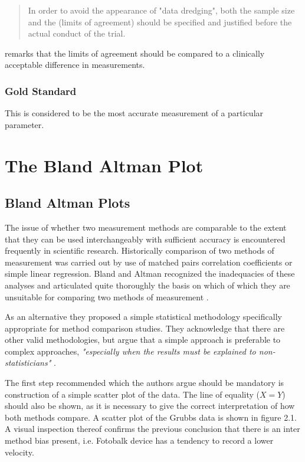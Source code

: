 \documentclass[12pt, a4paper]{report}
\begin{document}
\begin{quote}
In order to avoid the appearance of "data dredging", both the
sample size and the (limits of agreement) should be specified and
justified before the actual conduct of the trial. \citep{lin}
\end{quote}

\citet{Dewitte} remarks that the limits of agreement should be
compared to a clinically acceptable difference in measurements.


\subsection{Gold Standard} This is considered to be the most
accurate measurement of a particular parameter.

\chapter{The Bland Altman Plot}
\section{Bland Altman Plots}
The issue of whether two measurement methods are comparable to the
extent that they can be used interchangeably with sufficient
accuracy is encountered frequently in scientific research.
Historically comparison of two methods of measurement was carried
out by use of matched pairs correlation coefficients or simple
linear regression. Bland and Altman recognized the inadequacies of
these analyses and articulated quite thoroughly the basis on which
of which they are unsuitable for comparing two methods of
measurement \citep*{BA83}.

As an alternative they proposed a simple statistical methodology
specifically appropriate for method comparison studies. They
acknowledge that there are other valid methodologies, but argue
that a simple approach is preferable to complex approaches,
\emph{"especially when the results must be explained to
non-statisticians"} \citep*{BA83}.

The first step recommended which the authors argue should be
mandatory is construction of a simple scatter plot of the data.
The line of equality ($X=Y$) should also be shown, as it is
necessary to give the correct interpretation of how both methods
compare. A scatter plot of the Grubbs data is shown in figure 2.1.
A visual inspection thereof confirms the previous conclusion that
there is an inter method bias present, i.e. Fotobalk device has a
tendency to record a lower velocity.
\end{document}
